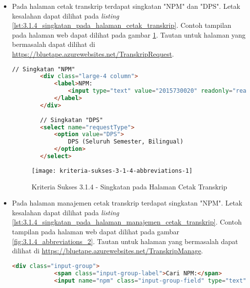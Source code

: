 \begin{itemize}
    \item Pada halaman cetak transkrip terdapat singkatan "NPM" dan "DPS". Letak kesalahan dapat dilihat pada \textit{listing} \ref{lst:3.1.4_singkatan_pada_halaman_cetak_transkrip}. Contoh tampilan pada halaman web dapat dilihat pada gambar \ref{fig:3.1.4_abbreviations_1}. Tautan untuk halaman yang bermasalah dapat dilihat di \url{https://bluetape.azurewebsites.net/TranskripRequest}.
    \begin{lstlisting}[frame=single, label={lst:3.1.4_singkatan_pada_halaman_cetak_transkrip}, language=HTML, caption=Kriteria Sukses 3.1.4 - Singkatan pada Halaman Cetak Transkrip]
        // Singkatan "NPM"
        <div class="large-4 column">
            <label>NPM:
                <input type="text" value="2015730020" readonly="readonly"/>
            </label>
        </div>
        
        // Singkatan "DPS"
        <select name="requestType">
            <option value="DPS">
                DPS (Seluruh Semester, Bilingual)
            </option>
        </select>
    \end{lstlisting}

    \begin{figure}[H]
        \centering  
        \texttt{[image: kriteria-sukses-3-1-4-abbreviations-1]}  
        \caption[Kriteria Sukses 3.1.4 - Singkatan pada Halaman Cetak Transkrip]{Kriteria Sukses 3.1.4 - Singkatan pada Halaman Cetak Transkrip}
        \label{fig:3.1.4_abbreviations_1}  
    \end{figure}

    \item Pada halaman manajemen cetak transkrip terdapat singkatan "NPM". Letak kesalahan dapat dilihat pada \textit{listing} \ref{lst:3.1.4_singkatan_pada_halaman_manajemen_cetak_transkrip}. Contoh tampilan pada halaman web dapat dilihat pada gambar \ref{fig:3.1.4_abbreviations_2}. Tautan untuk halaman yang bermasalah dapat dilihat di \url{https://bluetape.azurewebsites.net/TranskripManage}.
    \begin{lstlisting}[frame=single, label={lst:3.1.4_singkatan_pada_halaman_manajemen_cetak_transkrip}, language=HTML, caption=Kriteria Sukses 3.1.4 - Singkatan pada Halaman Manajemen Cetak Transkrip]
        <div class="input-group">
            <span class="input-group-label">Cari NPM:</span>
            <input name="npm" class="input-group-field" type="text" placeholder="2013730013" maxlength="10" minlength="10"/>
    \end{lstlisting}


\end{itemize}
